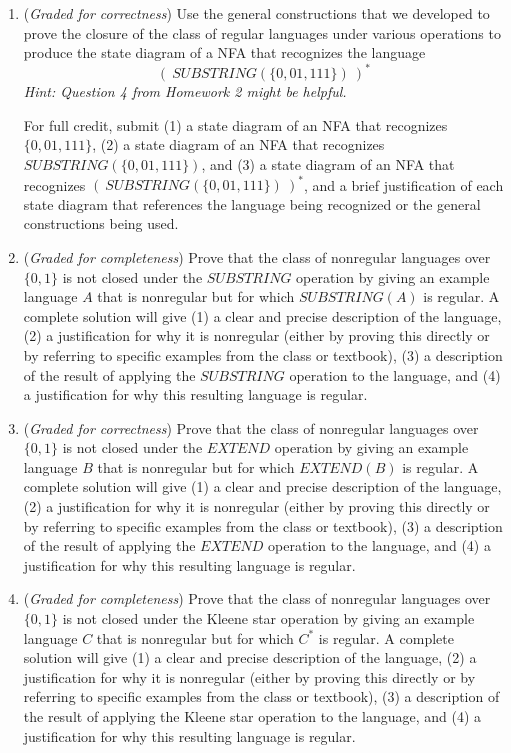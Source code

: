 \documentclass[12pt, oneside]{article}
\newcommand{\gradeCorrect}{({\it Graded for correctness}) }
\newcommand{\gradeComplete}{({\it Graded for completeness}) }
\begin{document}
\begin{enumerate}[wide, labelwidth=!, labelindent=0pt]
\begin{enumerate} 
   \item \gradeCorrect Use the general constructions that we developed
   to prove the closure of the class of regular languages under various operations to produce the state diagram of a NFA that recognizes the language
   \[
   (~SUBSTRING(\{0, 01, 111\})~)^*
   \]
   {\it Hint: Question 4 from Homework 2 might be helpful.}
   
    For full credit, submit (1) a state diagram of an NFA that recognizes $\{0,01,111\}$, (2) a state diagram of an NFA that recognizes $SUBSTRING(\{0, 01, 111\})$, and (3) a state diagram of an NFA that recognizes $(~SUBSTRING(\{0, 01, 111\})~)^*$, and a brief justification of each state diagram that 
    references the language being recognized or the general constructions being used.

   \item \gradeComplete Prove that the class of nonregular languages over $\{0,1\}$ is not closed under the $SUBSTRING$ operation by giving an example 
   language $A$ that is nonregular but for which $SUBSTRING(A)$ is regular.
   A complete solution will give 
   (1) a clear and precise
   description of the language, (2) a justification for why it is nonregular (either by proving this directly or by referring to specific examples from the class or textbook), (3) a description of the result of applying the 
   $SUBSTRING$ operation to the language, and  (4) a justification for
   why this resulting language is regular.

   \item  \gradeCorrect Prove that the class of nonregular languages over $\{0,1\}$ is not closed under the $EXTEND$ operation by giving an example 
   language $B$ that is nonregular but for which $EXTEND(B)$ is regular.
   A complete solution will give 
   (1) a clear and precise
   description of the language, (2) a justification for why it is nonregular (either by proving this directly or by referring to specific examples from the class or textbook), (3) a description of the result of applying the 
   $EXTEND$ operation to the language, and  (4) a justification for
   why this resulting language is regular.

   \item \gradeComplete   Prove that the class of nonregular languages over $\{0,1\}$ is not closed under the Kleene star operation by giving an example 
   language $C$ that is nonregular but for which $C^*$ is regular.
   A complete solution will give 
   (1) a clear and precise
   description of the language, (2) a justification for why it is nonregular (either by proving this directly or by referring to specific examples from the class or textbook), (3) a description of the result of applying the 
   Kleene star operation to the language, and  (4) a justification for
   why this resulting language is regular.
\end{enumerate}


\end{enumerate}
\end{document}
